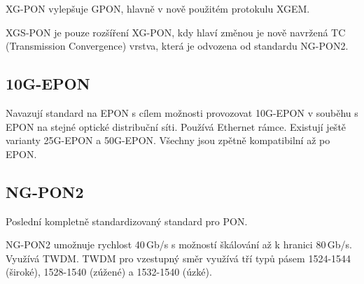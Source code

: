 XG-PON vylepšuje GPON, hlavně v nově použitém protokulu XGEM.

XGS-PON je pouze rozšíření XG-PON, kdy hlaví změnou je nově navržená TC (Transmission Convergence) vrstva, která je odvozena od standardu NG-PON2.

\subsection{10G-EPON}

Navazují standard na EPON s cílem možnosti provozovat 10G-EPON v souběhu s EPON na stejné optické distribuční síti. Používá Ethernet rámce. Existují ještě varianty 25G-EPON a 50G-EPON. Všechny jsou zpětně kompatibilní až po EPON.

\subsection{NG-PON2}
Poslední kompletně standardizovaný standard pro PON.

NG-PON2 umožnuje rychlost 40\,Gb/s s možností škálování až k hranici 80\,Gb/s. Využívá TWDM. TWDM pro vzestupný směr využívá tří typů pásem 1524-1544 (široké), 1528-1540 (zúžené) a 1532-1540 (úzké).

